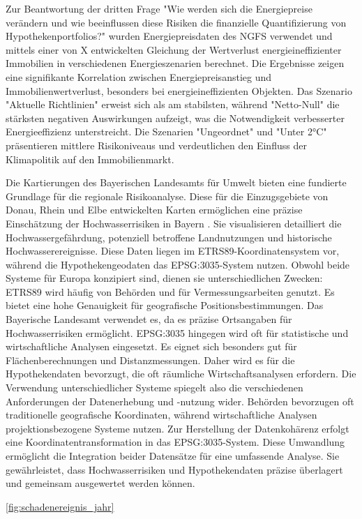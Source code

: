 Zur Beantwortung der dritten Frage "Wie werden sich die Energiepreise verändern und wie beeinflussen diese Risiken die finanzielle Quantifizierung von Hypothekenportfolios?" wurden Energiepreisdaten des NGFS verwendet und mittels einer von X entwickelten Gleichung der Wertverlust energieineffizienter Immobilien in verschiedenen Energieszenarien berechnet. Die Ergebnisse zeigen eine signifikante Korrelation zwischen Energiepreisanstieg und Immobilienwertverlust, besonders bei energieineffizienten Objekten. Das Szenario "Aktuelle Richtlinien" erweist sich als am stabilsten, während "Netto-Null" die stärksten negativen Auswirkungen aufzeigt, was die Notwendigkeit verbesserter Energieeffizienz unterstreicht. Die Szenarien "Ungeordnet" und "Unter 2°C" präsentieren mittlere Risikoniveaus und verdeutlichen den Einfluss der Klimapolitik auf den Immobilienmarkt.


Die Kartierungen des Bayerischen Landesamts für Umwelt bieten eine fundierte Grundlage für die regionale Risikoanalyse. Diese für die Einzugsgebiete von Donau, Rhein und Elbe entwickelten Karten ermöglichen eine präzise Einschätzung der Hochwasserrisiken in Bayern \parencite{LfU_Bayern}. Sie visualisieren detailliert die Hochwassergefährdung, potenziell betroffene Landnutzungen und historische Hochwasserereignisse.
Diese Daten liegen im ETRS89-Koordinatensystem vor, während die Hypothekengeodaten das EPSG:3035-System nutzen. Obwohl beide Systeme für Europa konzipiert sind, dienen sie unterschiedlichen Zwecken:
ETRS89 wird häufig von Behörden und für Vermessungsarbeiten genutzt. Es bietet eine hohe Genauigkeit für geografische Positionsbestimmungen. Das Bayerische Landesamt verwendet es, da es präzise Ortsangaben für Hochwasserrisiken ermöglicht.
EPSG:3035 hingegen wird oft für statistische und wirtschaftliche Analysen eingesetzt. Es eignet sich besonders gut für Flächenberechnungen und Distanzmessungen. Daher wird es für die Hypothekendaten bevorzugt, die oft räumliche Wirtschaftsanalysen erfordern.
Die Verwendung unterschiedlicher Systeme spiegelt also die verschiedenen Anforderungen der Datenerhebung und -nutzung wider. Behörden bevorzugen oft traditionelle geografische Koordinaten, während wirtschaftliche Analysen projektionsbezogene Systeme nutzen.
Zur Herstellung der Datenkohärenz erfolgt eine Koordinatentransformation in das EPSG:3035-System. Diese Umwandlung ermöglicht die Integration beider Datensätze für eine umfassende Analyse. Sie gewährleistet, dass Hochwasserrisiken und Hypothekendaten präzise überlagert und gemeinsam ausgewertet werden können.

\ref{fig:schadenereignis_jahr} 